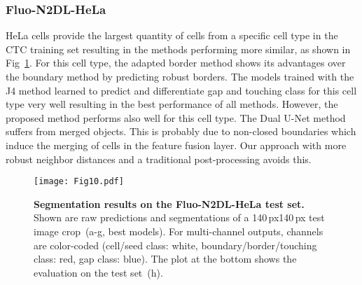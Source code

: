 \documentclass[10pt,letterpaper]{article}
\begin{document}
\subsubsection*{Fluo-N2DL-HeLa}
HeLa cells provide the largest quantity of cells from a specific cell type in the CTC training set resulting in the methods performing more similar, as shown in Fig~\ref{fig:fluo-n2dl-hela-results}. For this cell type, the adapted border method shows its advantages over the boundary method by predicting robust borders. The models trained with the J4 method learned to predict and differentiate gap and touching class for this cell type very well resulting in the best performance of all methods. However, the proposed method performs also well for this cell type. The Dual U-Net method suffers from merged objects. This is probably due to non-closed boundaries which induce the merging of cells in the feature fusion layer. Our approach with more robust neighbor distances and a traditional post-processing avoids this.
\begin{figure}
\begin{adjustwidth}{-2.25in}{0in}
\centering
\texttt{[image: Fig10.pdf]}
\caption{\textbf{Segmentation results on the Fluo-N2DL-HeLa test set.} Shown are raw predictions and segmentations of a 140\,px140\,px test image crop~(a-g, best  models). For multi-channel outputs, channels are color-coded (cell/seed class: white, boundary/border/touching class: red, gap class: blue). The plot at the bottom shows the evaluation on the test set~(h).}
\label{fig:fluo-n2dl-hela-results}
\end{adjustwidth}
\end{figure}
\end{document}
